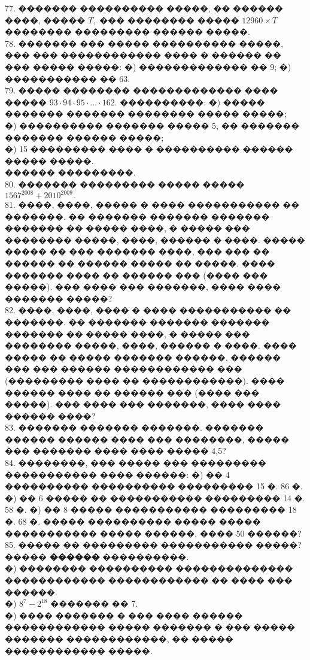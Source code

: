 \documentclass[12pt]{article}
\begin{document}
77. ������� ���������� �����, �� ������ ����, ����� $T,$ ��� �������� ����� $12960\times T$ �������� ��������� ������ �����.\\
78. ������� ��� ����� ���������� �����, ��� ��� ������������ ���� � ������ �� ��� ����� �����: �) ������������� �� 9; �) ����������� �� 63.\\
79. ����� �������� ������������� ���� ����� $93\cdot94\cdot95\cdot\ldots\cdot162.$ ����������:
�) ����� ������� ������� �������� ����� �����;\\
�) ���������� ������� ����� 5, �� ������� ������� ������ �����;\\
�) 15 ��������� ���� � ���������� ������ ����� �����.\\
������ ���������.\\
80. ������� ��������� ����� ����� $1567^{2008}+2010^{2009}.$\\
81. ����, ����, ����� � ���� ����������� �� �������. �� ������� ������� ������� ������� �� ����� ����, � ����� ��� �������� �����, ����, ������ � ����. ����� ����� �� ��� ������� ����, ��� ��� �� ������ �� ������ ����� �� �����. ���� ������� ���� �� ������ ��� (���� ��� �����). ��� ���� ��� �������, ���� ���� ������� �����?\\
82. ����, ����, ���� � ���� ����������� �� �������. �� ������� ������� ������� ������� �� ����� ����, � ����� ��� �������� �����, ����, ������ � ����. ���� ����� �� ����� ������� ������, ������ ��� ��� ������ ������������ ��� (��������� ���� �� ������������). ���� ������ ���� �� ������ ��� (���� ��� �����). ��� ���� ��� �������, ���� ���� ������ ����?\\
83. ������� ������� �������. ������� ������ ������ ���� ��� ��������, ����� ��� ������� ���� ���� ����� 4,5?\\
84. ��������, ��� ����� ��� ��������� ����������� ���� ������: �) �� 4 ���������� ���������� ��������� 15 �. 86 �. �) �� 6 ����� �� ����������� ��������� 14 �. 58 �. �) �� 8 ����� ����������� ��������� 18 �. 68 �. ����� ���������� ����� ����� ����������� ����� ������, ���� 50 ������?\\
85. ����� �� ��������� ����������� �����? ����� {\bf ������} ����������.\\
�) �������� ���������� �������������� ������������ ������������ �� ���� ��� ������.\\
�) $8^7-2^{18}$ ������� �� 7.\\
�) ���� ������� � ��� ���� ������ ������������ ����� ������� � ��� ����� ������� ������������, �� ����� ������������ �����.\\
\end{document}
